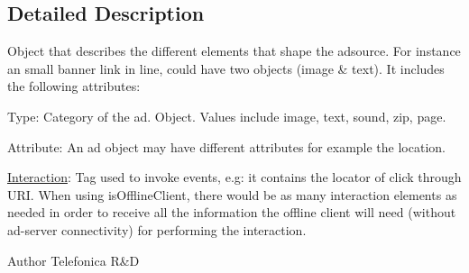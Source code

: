\subsection{Detailed Description}
Object that describes the different elements that shape the adsource. For instance an small banner link in line, could have two objects (image \& text). It includes the following attributes: 
\begin{DoxyItemize}
\item Type: Category of the ad. Object. Values include image, text, sound, zip, page. 
\item Attribute: An ad object may have different attributes for example the location. 
\item \hyperlink{classcom_1_1bluevia_1_1ad_1_1data_1_1Interaction}{Interaction}: Tag used to invoke events, e.g: it contains the locator of click through URI. When using isOfflineClient, there would be as many interaction elements as needed in order to receive all the information the offline client will need (without ad-\/server connectivity) for performing the interaction. 
\end{DoxyItemize}

\begin{DoxyAuthor}{Author}
Telefonica R\&D 
\end{DoxyAuthor}



